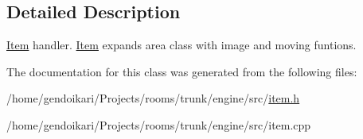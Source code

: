 \subsection{Detailed Description}
\hyperlink{classItem}{Item} handler. \hyperlink{classItem}{Item} expands area class with image and moving funtions. 

The documentation for this class was generated from the following files:\begin{DoxyCompactItemize}
\item 
/home/gendoikari/Projects/rooms/trunk/engine/src/\hyperlink{item_8h}{item.h}\item 
/home/gendoikari/Projects/rooms/trunk/engine/src/item.cpp\end{DoxyCompactItemize}
